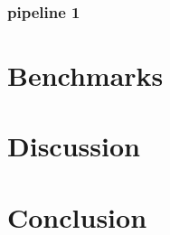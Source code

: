 \documentclass[a4paper]{article}
\begin{document}
\subsubsection{pipeline 1}
\label{sec:org0d26415}

\section{Benchmarks}
\label{sec:org58685a5}

\section{Discussion}
\label{sec:org23a43ee}

\section{Conclusion}
\label{sec:org73e5435}




\begin{appendix}

\end{appendix}
\end{document}
